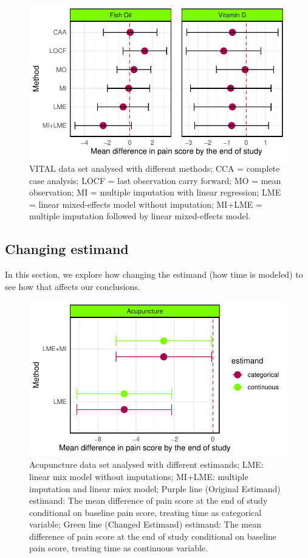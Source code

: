 \documentclass{article}
\newcommand{\pandocbounded}[1]{#1}
\begin{document}
\begin{figure}
\centering
\pandocbounded{\includegraphics[keepaspectratio]{Final_Report_files/figure-latex/unnamed-chunk-26-1.pdf}}
\caption{VITAL data set analysed with different methods; CCA = complete
case analysis; LOCF = last observation carry forward; MO = mean
observation; MI = multiple imputation with linear regression; LME =
linear mixed-effects model without imputation; MI+LME = multiple
imputation followed by linear mixed-effects model.}
\end{figure}

\subsection{Changing estimand}\label{changing-estimand}

In this section, we explore how changing the estimand (how time is
modeled) to see how that affects our conclusions.

\begin{figure}
\centering
\pandocbounded{\includegraphics[keepaspectratio]{Final_Report_files/figure-latex/unnamed-chunk-27-1.pdf}}
\caption{Acupuncture data set analysed with different estimands; LME:
linear mix model without imputations; MI+LME: multiple imputation and
linear miex model; Purple line (Original Estimand) estimand: The mean
difference of pain score at the end of study conditional on baseline
pain score, treating time as categorical variable; Green line (Changed
Estimand) estimand: The mean difference of pain score at the end of
study conditional on baseline pain score, treating time as continuous
variable.}
\end{figure}
\end{document}
